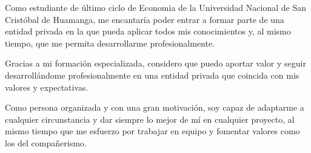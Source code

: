 
\par{

Como estudiante de último ciclo de Economia de la Universidad Nacional de San Cristóbal de Huamanga, me encantaría poder entrar a formar parte de una entidad privada en la que pueda aplicar todos mis conocimientos y, al mismo tiempo, que me permita desarrollarme profesionalmente.

Gracias a mi formación especializada, considero que puedo aportar valor y seguir desarrollándome profesionalmente en una entidad privada que coincida con mis valores y expectativas.

Como persona organizada y con una gran motivación, soy capaz de adaptarme a cualquier circunstancia y dar siempre lo mejor de mí en cualquier proyecto, al mismo tiempo que me esfuerzo por trabajar en equipo y fomentar valores como los del compañerismo.






}